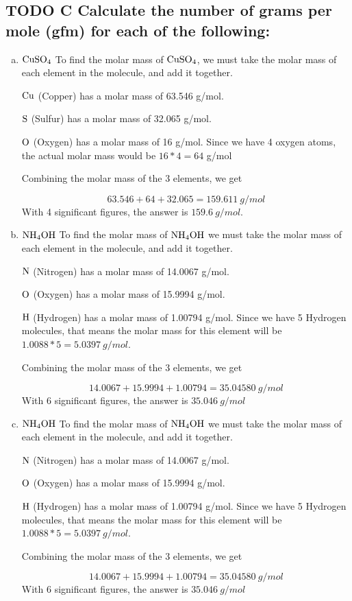 \documentclass[11pt]{article}
\begin{document}
\subsection{{\bfseries\sffamily TODO} C Calculate the number of grams per mole (gfm) for each of the following:}
\label{sec:orgf2915b5}
\begin{enumerate}[(a)]
\item \(\ce{CuSO4}\)
To find the molar mass of \(\ce{CuSO4}\), we must take the molar mass of
each element in the molecule, and add it together.

\(\ce{Cu}\) (Copper) has a molar mass of 63.546 g/mol.

\(\ce{S}\) (Sulfur) has a molar mass of 32.065 g/mol.

\(\ce{O}\) (Oxygen) has a molar mass of 16 g/mol. Since we have 4 oxygen
atoms, the actual molar mass would be \(16*4=64\) g/mol

Combining the molar mass of the 3 elements, we get

\begin{equation}
63.546+64+32.065=159.611\ g/mol
\end{equation}
With 4 significant figures, the answer is \textbf{\(159.6\ g/mol\)}.

\item \(\ce{NH4OH}\)
To find the molar mass of \(\ce{NH4OH}\) we must take the molar mass of each element in the molecule, and add it together.

\(\ce{N}\) (Nitrogen) has a molar mass of 14.0067 g/mol.

\(\ce{O}\) (Oxygen) has a molar mass of 15.9994 g/mol.

\(\ce{H}\) (Hydrogen) has a molar mass of 1.00794 g/mol. Since we have 5
Hydrogen molecules, that means the molar mass for this element will be
\(1.0088*5=5.0397\ g/mol\).

Combining the molar mass of the 3 elements, we get

\begin{equation}
14.0067+15.9994+1.00794=35.04580\ g/mol
\end{equation}
With 6 significant figures, the answer is \textbf{\(35.046\ g/mol\)}

\item \(\ce{NH4OH}\)
To find the molar mass of \(\ce{NH4OH}\) we must take the molar mass of each element in the molecule, and add it together.

\(\ce{N}\) (Nitrogen) has a molar mass of 14.0067 g/mol.

\(\ce{O}\) (Oxygen) has a molar mass of 15.9994 g/mol.

\(\ce{H}\) (Hydrogen) has a molar mass of 1.00794 g/mol. Since we have 5
Hydrogen molecules, that means the molar mass for this element will be
\(1.0088*5=5.0397\ g/mol\).

Combining the molar mass of the 3 elements, we get

\begin{equation}
14.0067+15.9994+1.00794=35.04580\ g/mol
\end{equation}
With 6 significant figures, the answer is \textbf{\(35.046\ g/mol\)}
\end{enumerate}
\end{document}
